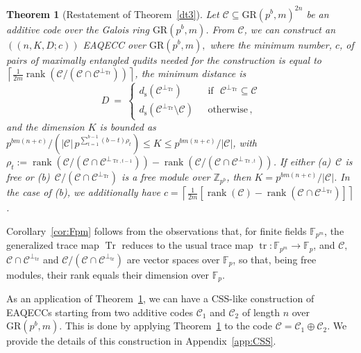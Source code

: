 \documentclass{article}
\DeclareMathOperator{\tr}{tr}
\DeclareMathOperator{\Tr}{Tr}
\DeclareMathOperator{\rank}{rank}
\def\F{\mathbb{F}}
\newtheorem{thm}{Theorem}[section]
\theoremstyle{remark}
\theoremstyle{definition}
\numberwithin{equation}{section}
\begin{document}
\begin{thm}[Restatement of Theorem~\ref{dt3}] 
\label{thm:dt3_restatement} Let $\mathcal{C} \subseteq \text{GR}(p^b,m)^{2n}$ be an additive code over the Galois ring $\text{GR}(p^b,m)$.   From $\mathcal{C}$, we can construct an  $((n,K,D;c))$ EAQECC over $\text{GR}(p^b,m),$ where the minimum number, $c$, of pairs of maximally entangled qudits needed for the construction is equal to  $\left\lceil \frac1{2m}\rank(\mathcal{C}/(\mathcal{C} \cap \mathcal{C}^{\perp_{\Tr}}))  \right\rceil$, the minimum distance is 
\begin{equation*}
D~=~\left\{\begin{array}{ll}
d_{\mathrm{s}}(\mathcal{C}^{\perp_{\Tr}}) & \text{~~if~~} \mathcal{C}^{\perp_{\Tr}} \subseteq \mathcal{C} \\
d_{\mathrm{s}}(\mathcal{C}^{\perp_{\Tr}}\setminus \mathcal{C} )  & \text{~~otherwise}\,,
\end{array}\right.
\end{equation*}
and the dimension $K$ is bounded as $p^{bm(n+c)}/ (|\mathcal{C}| \, {p^{\sum_{t=1}^{b-1} (b-t)\rho_t}}) \leq  K \leq p^{bm(n+c)}/|\mathcal{C}|$, with $\rho_t := \rank(\mathcal{C}/(\mathcal{C} \cap \mathcal{C}^{\perp_{\Tr,t-1}}))-\rank(\mathcal{C}/(\mathcal{C} \cap \mathcal{C}^{\perp_{\Tr,t}}))$. If either \emph{(a)}~$\mathcal{C}$ is free or \emph{(b)}~$\mathcal{C}/(\mathcal{C} \cap \mathcal{C}^{\perp_{\Tr}})$ is a free module over $\mathbb{Z}_{p^b}$, then $K = p^{bm(n+c)}/|\mathcal{C}|$. In the case of \emph{(b)}, we additionally have $c=\left\lceil \frac1{2m}[\rank(\mathcal{C}) - \rank(\mathcal{C} \cap \mathcal{C}^{\perp_{\Tr}})]\right\rceil$.
\end{thm}

Corollary~\ref{cor:Fpm} follows from the observations that, for finite fields $\F_{p^m}$, the generalized trace map $\Tr$ reduces to the usual trace map $\tr: \F_{p^m} \to \F_p$, and $\mathcal{C},$ $\mathcal{C} \cap \mathcal{C}^{\perp_{\tr}}$ and $\mathcal{C}/(\mathcal{C} \cap \mathcal{C}^{\perp_{\tr}})$ are vector spaces over $\F_p$, so that, being free modules, their rank equals their dimension over $\F_p$. 

As an application of Theorem~\ref{thm:dt3_restatement}, we can have a CSS-like construction of EAQECCs starting from two additive codes $\mathcal{C}_1$ and $\mathcal{C}_2$ of length $n$ over $\text{GR}(p^b,m)$. This is done by applying Theorem~\ref{thm:dt3_restatement} to the code $\mathcal{C} = \mathcal{C}_1 \oplus \mathcal{C}_2$. We provide the details of this construction in Appendix~\ref{app:CSS}.
\end{document}
